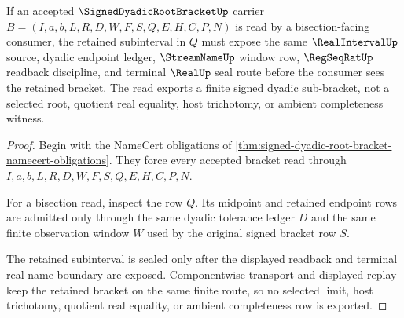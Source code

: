 \begin{theorem}
\label{thm:signed-dyadic-root-bracket-bisection-stability}
If an accepted $\SignedDyadicRootBracketUp$ carrier $B=(I,a,b,L,R,D,W,F,S,Q,E,H,C,P,N)$ is read by a bisection-facing consumer, the retained subinterval in $Q$ must expose the same $\RealIntervalUp$ source, dyadic endpoint ledger, $\StreamNameUp$ window row, $\RegSeqRatUp$ readback discipline, and terminal $\RealUp$ seal route before the consumer sees the retained bracket. The read exports a finite signed dyadic sub-bracket, not a selected root, quotient real equality, host trichotomy, or ambient completeness witness.
\end{theorem}
\begin{proof}
Begin with the NameCert obligations of \autoref{thm:signed-dyadic-root-bracket-namecert-obligations}. They force every accepted bracket read through $I,a,b,L,R,D,W,F,S,Q,E,H,C,P,N$.

For a bisection read, inspect the row $Q$. Its midpoint and retained endpoint rows are admitted only through the same dyadic tolerance ledger $D$ and the same finite observation window $W$ used by the original signed bracket row $S$.

The retained subinterval is sealed only after the displayed readback and terminal real-name boundary are exposed. Componentwise transport and displayed replay keep the retained bracket on the same finite route, so no selected limit, host trichotomy, quotient real equality, or ambient completeness row is exported.
\end{proof}


\begin{closurestatus}{\SignedDyadicRootBracketUp}
  \theoryclosure{\seedClosure}
  \formalstatus{\unformalizedV}
\end{closurestatus}
